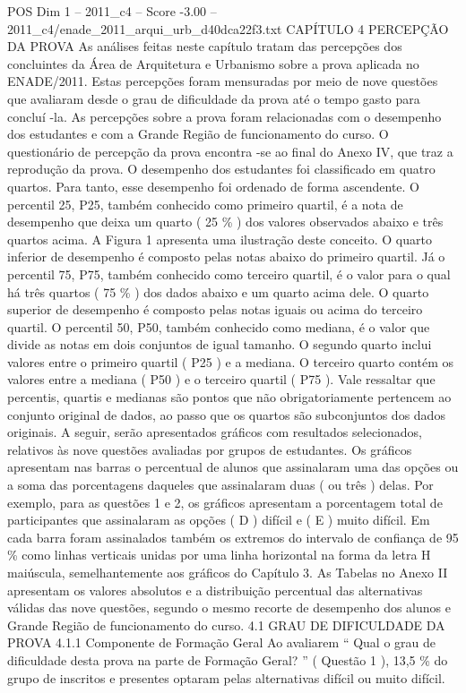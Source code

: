 \begin{textsample}{POS Dim 1 – 2011\_c4 – Score -3.00 – 2011\_c4/enade\_2011\_arqui\_urb\_d40dca22f3.txt}  \label{ex:f1_pos_324}
CAPÍTULO 4 PERCEPÇÃO DA PROVA As análises feitas neste capítulo tratam das percepções dos concluintes da Área de Arquitetura e Urbanismo sobre a prova aplicada no ENADE/2011.
Estas percepções foram mensuradas por meio de nove questões que avaliaram desde o grau de dificuldade da prova até o tempo gasto para concluí -la.
As percepções sobre a prova foram relacionadas com o desempenho dos estudantes e com a Grande Região de funcionamento do curso.
O questionário de percepção da prova encontra -se ao final do Anexo IV, que traz a reprodução da prova.
O desempenho dos estudantes foi classificado em quatro quartos.
Para tanto, esse desempenho foi ordenado de forma ascendente.
O percentil 25, P25, também conhecido como primeiro quartil, é a nota de desempenho que deixa um quarto ( 25 \% ) dos valores observados abaixo e três quartos acima.
A Figura 1 apresenta uma ilustração deste conceito.
O quarto inferior de desempenho é composto pelas notas abaixo do primeiro quartil.
Já o percentil 75, P75, também conhecido como terceiro quartil, é o valor para o qual há três quartos ( 75 \% ) dos dados abaixo e um quarto acima dele.
O quarto superior de desempenho é composto pelas notas iguais ou acima do terceiro quartil.
O percentil 50, P50, também conhecido como mediana, é o valor que divide as notas em dois conjuntos de igual tamanho.
O segundo quarto inclui valores entre o primeiro quartil ( P25 ) e a mediana.
O terceiro quarto contém os valores entre a mediana ( P50 ) e o terceiro quartil ( P75 ).
Vale ressaltar que percentis, quartis e medianas são pontos que não obrigatoriamente pertencem ao conjunto original de dados, ao passo que os quartos são subconjuntos dos dados originais.
A seguir, serão apresentados gráficos com resultados selecionados, relativos às nove questões avaliadas por grupos de estudantes.
Os gráficos apresentam nas barras o percentual de alunos que assinalaram uma das opções ou a soma das porcentagens daqueles que assinalaram duas ( ou três ) delas.
Por exemplo, para as questões 1 e 2, os gráficos apresentam a porcentagem total de participantes que assinalaram as opções ( D ) difícil e ( E ) muito difícil.
Em cada barra foram assinalados também os extremos do intervalo de confiança de 95 \% como linhas verticais unidas por uma linha horizontal na forma da letra H maiúscula, semelhantemente aos gráficos do Capítulo 3.
As Tabelas no Anexo II apresentam os valores absolutos e a distribuição percentual das alternativas válidas das nove questões, segundo o mesmo recorte de desempenho dos alunos e Grande Região de funcionamento do curso. 4.1 GRAU DE DIFICULDADE DA PROVA 4.1.1 Componente de Formação Geral Ao avaliarem “ Qual o grau de dificuldade desta prova na parte de Formação Geral? ” ( Questão 1 ), 13,5 \% do grupo de inscritos e presentes optaram pelas alternativas difícil ou muito difícil.

\end{textsample}
